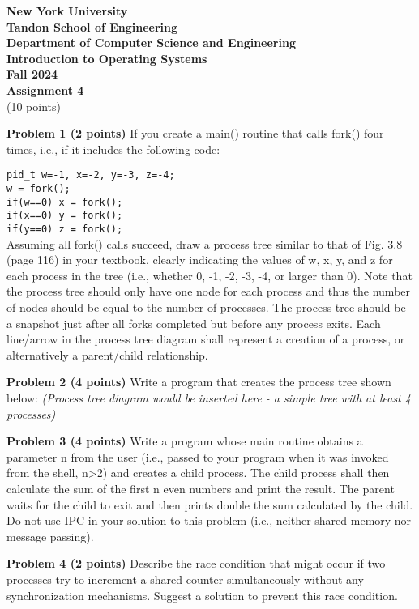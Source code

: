 \documentclass{article}
\begin{document}
\textbf{New York University} \\
\textbf{Tandon School of Engineering} \\
\textbf{Department of Computer Science and Engineering} \\
\textbf{Introduction to Operating Systems} \\
\textbf{Fall 2024} \\
\textbf{Assignment 4} \\
(10 points)


\textbf{Problem 1 (2 points)} If you create a main() routine that calls fork() four times, i.e., if it includes the following code:

\texttt{pid\_t w=-1, x=-2, y=-3, z=-4;} \\
\texttt{w = fork();}\\
\texttt{if(w==0) x = fork();}\\
\texttt{if(x==0) y = fork();}\\
\texttt{if(y==0) z = fork();}\\

Assuming all fork() calls succeed, draw a process tree similar to that of Fig. 3.8 (page 116) in your textbook, clearly indicating the values of w, x, y, and z for each process in the tree (i.e., whether 0, -1, -2, -3, -4, or larger than 0).
Note that the process tree should only have one node for each process and thus the number of nodes should be equal to the number of processes.
The process tree should be a snapshot just after all forks completed but before any process exits.
Each line/arrow in the process tree diagram shall represent a creation of a process, or alternatively a parent/child relationship.


\textbf{Problem 2 (4 points)} Write a program that creates the process tree shown below:
\textit{(Process tree diagram would be inserted here -  a simple tree with at least 4 processes)}


\textbf{Problem 3 (4 points)} Write a program whose main routine obtains a parameter n from the user (i.e., passed to your program when it was invoked from the shell, n>2) and creates a child process. The child process shall then calculate the sum of the first n even numbers and print the result. The parent waits for the child to exit and then prints double the sum calculated by the child. Do not use IPC in your solution to this problem (i.e., neither shared memory nor message passing).


\textbf{Problem 4 (2 points)}  Describe the race condition that might occur if two processes try to increment a shared counter simultaneously without any synchronization mechanisms.  Suggest a solution to prevent this race condition.
\end{document}
